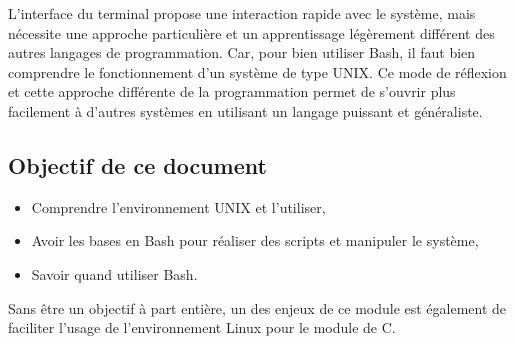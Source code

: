 L'interface du terminal propose une interaction rapide avec le système, mais nécessite une approche particulière et un apprentissage légèrement différent des autres langages de programmation. Car, pour bien utiliser Bash, il faut bien comprendre le fonctionnement d'un système de type UNIX. Ce mode de réflexion et cette approche différente de la programmation permet de s'ouvrir plus facilement à d'autres systèmes en utilisant un langage puissant et généraliste.

\subsection*{Objectif de ce document}
\begin{itemize}
    \item Comprendre l'environnement UNIX et l'utiliser,
    \item Avoir les bases en Bash pour réaliser des scripts et manipuler le système,
    \item Savoir quand utiliser Bash.
\end{itemize}

Sans être un objectif à part entière, un des enjeux de ce module est également de faciliter l'usage de l'environnement Linux pour le module de C.